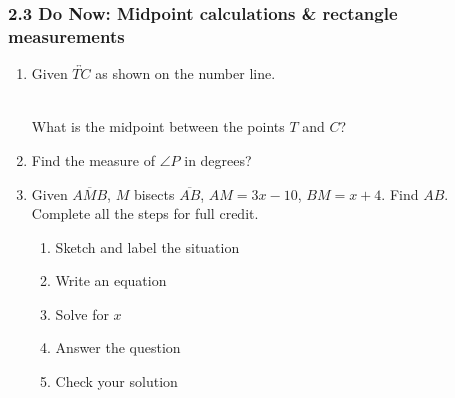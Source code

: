\documentclass[12pt, twoside]{article}
\begin{document}
  \subsubsection*{2.3 Do Now: Midpoint calculations \& rectangle measurements}
    \begin{enumerate}

    \item Given $\overleftrightarrow{TC}$ as shown on the number line. \\[20pt] %
     \\ \bigskip
    What is the midpoint between the points $T$ and $C$? \vspace{2cm}  

    \item Find the measure of $\angle P$ in degrees? \vspace{0.25cm}
    \begin{center}
    \end{center}  \vspace{1cm}

    \item Given $\overline{AMB}$, $M$ bisects $\overline{AB}$, $AM=3x-10$, $BM=x+4$. Find ${AB}$.\\
    Complete all the steps for full credit. \smallskip
      \begin{enumerate}
        \item Sketch and label the situation
        \item Write an equation
        \item Solve for $x$
        \item Answer the question
        \item Check your solution
      \end{enumerate}


\end{enumerate}
\end{document}

